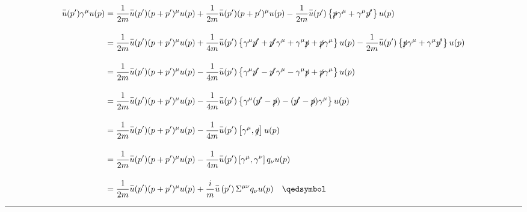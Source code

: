\begin{solution}
\begin{align}
    \overbar{u}(p')\gamma^\mu u(p) &=   \frac{1}{2m}   \overbar{u}(p') (p+p')^\mu  u(p) + \frac{1}{2m}   \overbar{u}(p') (p+p')^\mu  u(p)  - \frac{1}{2m} \overbar{u}(p') \left\{ \slashed{p}\gamma^\mu + \gamma^\mu \slashed{p'} \right\}  u(p)  \nonumber \\[0.15in]
                                   &=   \frac{1}{2m}   \overbar{u}(p') (p+p')^\mu  u(p) + \frac{1}{4m} \overbar{u}(p') \left\{ \gamma^\mu \slashed{p'} + \slashed{p'}\gamma^\mu + \gamma^\mu \slashed{p} + \slashed{p}\gamma^\mu \right\} u(p) - \frac{1}{2m} \overbar{u}(p') \left\{ \slashed{p}\gamma^\mu + \gamma^\mu \slashed{p'} \right\}  u(p)  \nonumber \\[0.15in]
                                   &=   \frac{1}{2m}   \overbar{u}(p') (p+p')^\mu  u(p) - \frac{1}{4m} \overbar{u}(p') \left\{  \gamma^\mu \slashed{p'} - \slashed{p'}\gamma^\mu - \gamma^\mu \slashed{p} + \slashed{p}\gamma^\mu \right\} u(p)  \nonumber \\[0.15in]
                                   &=   \frac{1}{2m}   \overbar{u}(p') (p+p')^\mu  u(p) - \frac{1}{4m} \overbar{u}(p') \left\{ \gamma^\mu (\slashed{p'}-\slashed{p}) - (\slashed{p'}-\slashed{p}) \gamma^\mu \right\} u(p)  \nonumber \\[0.15in]
                                   &=   \frac{1}{2m}   \overbar{u}(p') (p+p')^\mu  u(p) - \frac{1}{4m} \overbar{u}(p') \left[  \gamma^\mu , \slashed{q} \right] u(p)  \nonumber \\[0.15in]
                                   &=   \frac{1}{2m}   \overbar{u}(p') (p+p')^\mu  u(p) - \frac{1}{4m} \overbar{u}(p') \left[  \gamma^\mu , \gamma^\nu \right] q_\nu u(p)  \nonumber \\[0.15in]
                                   &=   \frac{1}{2m}   \overbar{u}(p') (p+p')^\mu  u(p) + \frac{i}{m} \overbar{u}\left(p'\right) \Sigma^{\mu\nu} q_\nu u(p) \qed \nonumber
\end{align}
\end{solution}

\noindent\rule{7in}{1.5pt}

